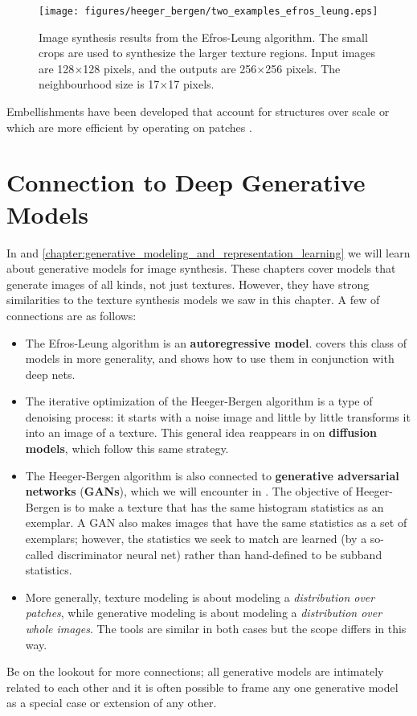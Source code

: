 {\begin{figure}
\centerline{
\texttt{[image: figures/heeger\_bergen/two\_examples\_efros\_leung.eps]}
}
\caption{Image synthesis results from the Efros-Leung algorithm.  The small crops are used to synthesize the larger texture regions. Input images are 128$\times$128 pixels, and the outputs are 256$\times$256 pixels. The neighbourhood size is 17$\times$17 pixels. 
}
\label{fig:efrosresult}
\end{figure}

Embellishments have been developed that account for structures over scale \cite{DeBonet98} or which are more efficient by operating on patches \cite{Efros01,Barnes09}. %


\section{Connection to Deep Generative Models}
In \chaps{\ref{chapter:generative_models}} and \ref{chapter:generative_modeling_and_representation_learning} we will learn about generative models for image synthesis. These chapters cover models that generate images of all kinds, not just textures. However, they have strong similarities to the texture synthesis models we saw in this chapter. A few of connections are as follows:
\begin{itemize}
    \item The Efros-Leung algorithm is an \textbf{autoregressive model}. \Sect{\ref{sec:generative_models:autoregressive}} covers this class of models in more generality, and shows how to use them in conjunction with deep nets.
    \item The iterative optimization of the Heeger-Bergen algorithm is a type of denoising process: it starts with a noise image and little by little transforms it into an image of a texture. This general idea reappears in \sect{\ref{sec:generative_models:diffusion_models}} on \textbf{diffusion models}, which follow this same strategy.
    \item The Heeger-Bergen algorithm is also connected to \textbf{generative adversarial networks} (\textbf{GANs}), which we will encounter in \sect{\ref{sec:generative_models:GANs}}. The objective of Heeger-Bergen is to make a texture that has the same histogram statistics as an exemplar. A GAN also makes images that have the same statistics as a set of exemplars; however, the statistics we seek to match are learned (by a so-called discriminator neural net) rather than hand-defined to be subband statistics.
    \item More generally, texture modeling is about modeling a \textit{distribution over patches}, while generative modeling is about modeling a \textit{distribution over whole images}. The tools are similar in both cases but the scope differs in this way.
\end{itemize}
Be on the lookout for more connections; all generative models are intimately related to each other and it is often possible to frame any one generative model as a special case or extension of any other.

}
